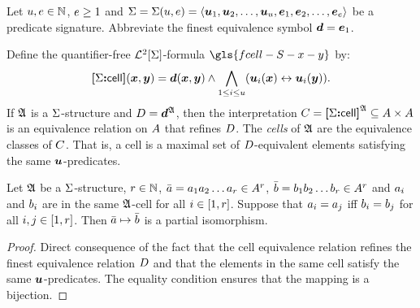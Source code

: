 
Let $u, e \in \mathbb{N}$, $e \geq 1$ and $\mathrm{\Sigma} = \mathrm{\Sigma}(u,e) =
\left\langle \bm{u}_{1},\bm{u}_{2},\dots,\bm{u}_{u},\bm{e}_{1},\bm{e}_{2},\dots,\bm{e}_{e} \right\rangle$
be a predicate signature.
Abbreviate the finest equivalence symbol $\bm{d} = \bm{e}_{1}$.

\begin{definition}
Define the quantifier-free $\mathcal{L}^{2}[\mathrm{\Sigma}]$-formula $\gls{fcell-S-x-y}$ by:
\[
  {\bm{[}\mathrm{\Sigma}\mathord{\bm{:}}\mathsf{cell}\bm{]}}(\bm{x},\bm{y}) = \bm{d}(\bm{x},\bm{y}) \land
  \bigwedge_{1 \leq i \leq u} (\bm{u}_{i}(\bm{x}) \leftrightarrow \bm{u}_{i}(\bm{y})).
\]
If $\mathfrak{A}$ is a $\mathrm{\Sigma}$-structure and $D = \bm{d}^{\mathfrak{A}}$, then the
interpretation $C = {\bm{[}\mathrm{\Sigma}\mathord{\bm{:}}\mathsf{cell}\bm{]}}^{\mathfrak{A}} \subseteq {A\times A}$ is an
equivalence relation on $A$ that refines $D$.
The \emph{cells} of $\mathfrak{A}$ are the equivalence classes of $C$.
That is, a cell is a maximal set of $D$-equivalent elements satisfying the
same $\bm{u}$-predicates.
\end{definition}

\begin{remark}\label{rem:monadic-same-cell-r}
Let $\mathfrak{A}$ be a $\mathrm{\Sigma}$-structure, $r \in \mathbb{N}$,
$\bar{a} = a_{1}a_{2}\dots a_{r} \in A^r$,
$\bar{b} = b_{1}b_{2}\dots b_{r} \in A^r$ and $a_{i}$ and $b_{i}$
are in the same $\mathfrak{A}$-cell for all $i \in [1,r]$.
Suppose that $a_{i} = a_{j}$ iff $b_{i} = b_{j}$ for all $i, j \in
[1,r]$.
Then $\bar{a} \mapsto \bar{b}$ is a partial isomorphism.
\end{remark}
\begin{proof}
Direct consequence of the fact that the cell equivalence relation refines the
finest equivalence relation $D$ and that the elements in the same cell
satisfy the same $\bm{u}$-predicates.
The equality condition ensures that the mapping is a bijection.
\end{proof}

